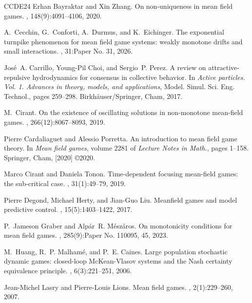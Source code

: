 \documentclass{amsart}
\theoremstyle{remark}
\theoremstyle{definition}
\theoremstyle{Claim}
\theoremstyle{plain}
\begin{document}
\begin{thebibliography}{CCDE24}
Erhan Bayraktar and Xin Zhang.
\newblock On non-uniqueness in mean field games.
, 148(9):4091--4106, 2020.

A.~Cecchin, G.~Conforti, A.~Durmus, and K.~Eichinger.
\newblock The exponential turnpike phenomenon for mean field game systems:
  weakly monotone drifts and small interactions.
, 31:Paper No. 31, 2026.

Jos\'e{}~A. Carrillo, Young-Pil Choi, and Sergio~P. Perez.
\newblock A review on attractive-repulsive hydrodynamics for consensus in
  collective behavior.
\newblock In {\em Active particles. {V}ol. 1. {A}dvances in theory, models, and
  applications}, Model. Simul. Sci. Eng. Technol., pages 259--298.
  Birkh\"auser/Springer, Cham, 2017.

M.~Cirant.
\newblock On the existence of oscillating solutions in non-monotone mean-field
  games.
, 266(12):8067--8093, 2019.

Pierre Cardaliaguet and Alessio Porretta.
\newblock An introduction to mean field game theory.
\newblock In {\em Mean field games}, volume 2281 of {\em Lecture Notes in
  Math.}, pages 1--158. Springer, Cham, [2020] \copyright 2020.

Marco Cirant and Daniela Tonon.
\newblock Time-dependent focusing mean-field games: the sub-critical case.
, 31(1):49--79, 2019.


Pierre Degond, Michael Herty, and Jian-Guo Liu.
\newblock Meanfield games and model predictive control.
, 15(5):1403--1422, 2017.

P.~Jameson Graber and Alp\'{a}r~R. M\'{e}sz\'{a}ros.
\newblock On monotonicity conditions for mean field games.
, 285(9):Paper No. 110095, 45, 2023.

M.~Huang, R.~P. Malham\'e, and P.~E. Caines.
\newblock Large population stochastic dynamic games: closed-loop
  {McKean}-{Vlasov} systems and the {Nash} certainty equivalence principle.
, 6(3):221--251, 2006.

Jean-Michel Lasry and Pierre-Louis Lions.
\newblock Mean field games.
, 2(1):229--260, 2007.


\end{thebibliography}
\end{document}

